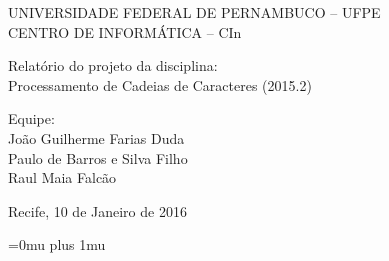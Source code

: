 \documentclass[11pt]{article}
\begin{document}
\begin{center}
UNIVERSIDADE FEDERAL DE PERNAMBUCO – UFPE\\
CENTRO DE INFORMÁTICA – CIn\\[10\baselineskip]
\end{center}

\begin{center}
Relatório do projeto da disciplina:\\
Processamento de Cadeias de Caracteres
(2015.2)\\[10\baselineskip]
\end{center}
Equipe:\\
João Guilherme Farias Duda\\
Paulo de Barros e Silva Filho\\
Raul Maia Falcão\\[8\baselineskip]


\begin{center}
Recife, 10 de Janeiro de 2016
\end{center}

\cleardoublepage

\tableofcontents

\cleardoublepage


%







\Urlmuskip=0mu plus 1mu\relax


\end{document}

